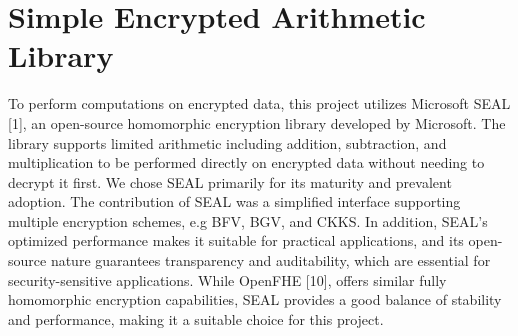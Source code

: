 \section{Simple Encrypted Arithmetic Library}

To perform computations on encrypted data, this project utilizes Microsoft SEAL [1], an open-source homomorphic encryption library developed by Microsoft. The library supports limited arithmetic including addition, subtraction, and multiplication to be performed directly on encrypted data without needing to decrypt it first. We chose SEAL primarily for its maturity and prevalent adoption. The contribution of SEAL was a simplified interface supporting multiple encryption schemes, e.g BFV, BGV, and CKKS. In addition, SEAL's optimized performance makes it suitable for practical applications, and its open-source nature guarantees transparency and auditability, which are essential for security-sensitive applications. While OpenFHE [10], offers similar fully homomorphic encryption capabilities, SEAL provides a good balance of stability and performance, making it a suitable choice for this project.
